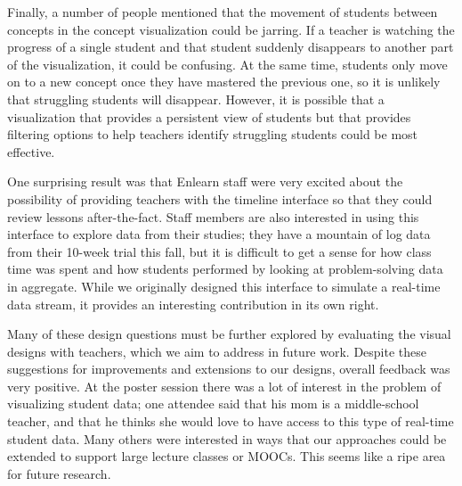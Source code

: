 \documentclass{sigchi}
\begin{document}
Finally, a number of people mentioned that the movement of students between concepts in the concept visualization could be jarring. If a teacher is watching the progress of a single student and that student suddenly disappears to another part of the visualization, it could be confusing. At the same time, students only move on to a new concept once they have mastered the previous one, so it is unlikely that struggling students will disappear. However, it is possible that a visualization that provides a persistent view of students but that provides filtering options to help teachers identify struggling students could be most effective.

One surprising result was that Enlearn staff were very excited about the possibility of providing teachers with the timeline interface so that they could review lessons after-the-fact. Staff members are also interested in using this interface to explore data from their studies; they have a mountain of log data from their 10-week trial this fall, but it is difficult to get a sense for how class time was spent and how students performed by looking at problem-solving data in aggregate. While we originally designed this interface to simulate a real-time data stream, it provides an interesting contribution in its own right.

Many of these design questions must be further explored by evaluating the visual designs with teachers, which we aim to address in future work. Despite these suggestions for improvements and extensions to our designs, overall feedback was very positive. At the poster session there was a lot of interest in the problem of visualizing student data; one attendee said that his mom is a middle-school teacher, and that he thinks she would love to have access to this type of real-time student data. Many others were interested in ways that our approaches could be extended to support large lecture classes or MOOCs. This seems like a ripe area for future research.



\end{document}
